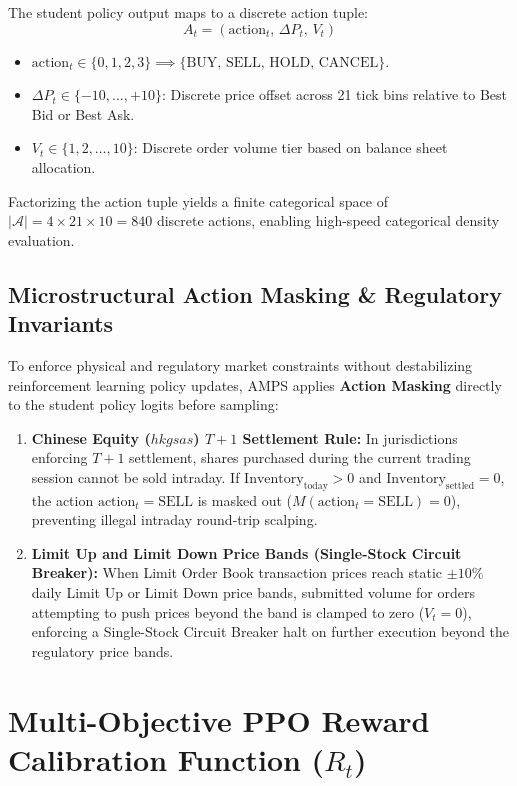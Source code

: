 The student policy output maps to a discrete action tuple:
\begin{equation}
    A_t = (\text{action}_t, \, \Delta P_t, \, V_t)
\end{equation}
\begin{itemize}
    \item $\text{action}_t \in \{0, 1, 2, 3\} \implies \{\text{BUY}, \, \text{SELL}, \, \text{HOLD}, \, \text{CANCEL}\}$.
    \item $\Delta P_t \in \{-10, \dots, +10\}$: Discrete price offset across 21 tick bins relative to Best Bid or Best Ask.
    \item $V_t \in \{1, 2, \dots, 10\}$: Discrete order volume tier based on balance sheet allocation.
\end{itemize}

Factorizing the action tuple yields a finite categorical space of $|\mathcal{A}| = 4 \times 21 \times 10 = 840$ discrete actions, enabling high-speed categorical density evaluation.

\subsection{Microstructural Action Masking \& Regulatory Invariants}

To enforce physical and regulatory market constraints without destabilizing reinforcement learning policy updates, AMPS applies \textbf{Action Masking} directly to the student policy logits before sampling:
\begin{enumerate}
    \item \textbf{Chinese Equity ($hkgsas$) $T+1$ Settlement Rule:} In jurisdictions enforcing $T+1$ settlement, shares purchased during the current trading session cannot be sold intraday. If $\text{Inventory}_{\text{today}} > 0$ and $\text{Inventory}_{\text{settled}} = 0$, the action $\text{action}_t = \text{SELL}$ is masked out ($M(\text{action}_t = \text{SELL}) = 0$), preventing illegal intraday round-trip scalping.
    \item \textbf{Limit Up and Limit Down Price Bands (Single-Stock Circuit Breaker):} When Limit Order Book transaction prices reach static $\pm 10\%$ daily Limit Up or Limit Down price bands, submitted volume for orders attempting to push prices beyond the band is clamped to zero ($V_t = 0$), enforcing a Single-Stock Circuit Breaker halt on further execution beyond the regulatory price bands.
\end{enumerate}

\section{Multi-Objective PPO Reward Calibration Function ($R_t$)}

